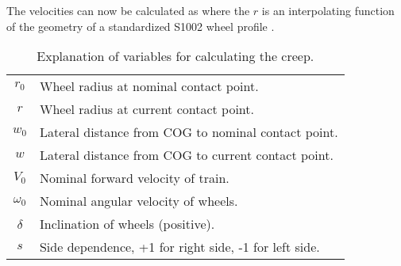 The velocities can now be calculated as
where the $r$ is an interpolating function of the geometry of a standardized S1002 wheel profile \cite{railvehicledynamics_eandersson}.

\begin{table}[htpb!]
 \centering
 \caption{Explanation of variables for calculating the creep.}
 \begin{tabular}{c | l}
  $r_0$		 & Wheel radius at nominal contact point.\\
  $r$            & Wheel radius at current contact point.\\
  $w_0$		 & Lateral distance from COG to nominal contact point.\\
  $w$		 & Lateral distance from COG to current contact point.\\
  $V_0$		 & Nominal forward velocity of train.\\
  $\omega_0$	 & Nominal angular velocity of wheels.\\
  $\delta$	 & Inclination of wheels (positive).\\
  $s$		 & Side dependence, +1 for right side, -1 for left side.
 \end{tabular}
\end{table}

